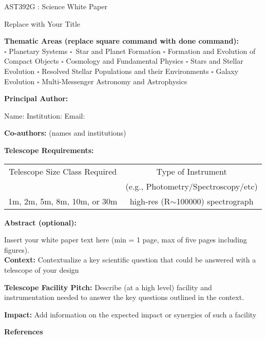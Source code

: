 \documentclass[12pt]{article}
\begin{document}
\raggedright
\huge
AST392G : Science White Paper \linebreak

Replace with Your Title \linebreak
\normalsize

\noindent \textbf{Thematic Areas (replace square command with done command):\\} \hspace*{60pt} $\square$ Planetary Systems \hspace*{10pt} $\square$\ Star and Planet Formation \hspace*{20pt}\linebreak
$\square$ Formation and Evolution of Compact Objects \hspace*{31pt} $\square$ Cosmology and Fundamental Physics \linebreak
  $\square$  Stars and Stellar Evolution \hspace*{1pt} $\square$ Resolved Stellar Populations and their Environments \hspace*{40pt} \linebreak
  $\square$    Galaxy Evolution   \hspace*{45pt} $\square$             Multi-Messenger Astronomy and Astrophysics \hspace*{65pt} \linebreak
  
\textbf{Principal Author:}

Name: 
 \linebreak           
Institution:  
 \linebreak
Email: 
 \linebreak
 
\textbf{Co-authors:} (names and institutions)
  \linebreak

\textbf{Telescope Requirements:} 
\begin{center}
\begin{tabular}{||c | c ||} 
 \hline
 Telescope Size Class Required  & Type of Instrument\\ 
 & (e.g., Photometry/Spectroscopy/etc)\\ [0.5ex] 
 \hline\hline
 1m, 2m, 5m, 8m, 10m, or 30m  & high-res (R$\sim$100000) spectrograph\\

 \hline
\end{tabular}
\end{center}

\textbf{Abstract  (optional):}


\pagebreak
Insert your white paper text here (min = 1 page, max of five pages including figures).\\


{\bf Context: } Contextualize a key scientific question that could be answered with a telescope of your design


{\bf Telescope Facility Pitch: } Describe (at a high level) facility and instrumentation needed to answer the key questions outlined in the context. 


{\bf Impact:  } Add information on the expected impact or synergies of such a facility


\pagebreak
\textbf{References}
\end{document}
